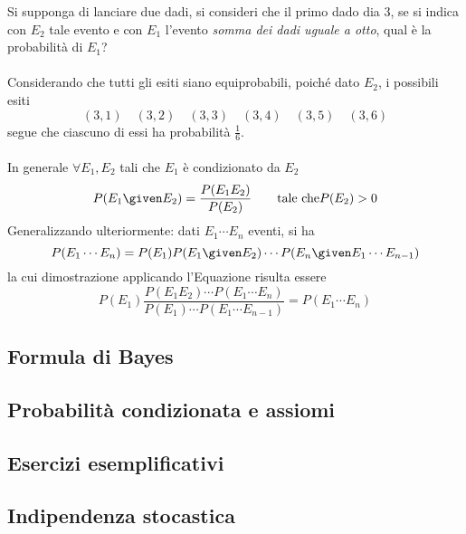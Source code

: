\documentclass{subfiles}
\begin{document}
Si supponga di lanciare due dadi, si consideri che il primo dado dia 3, se si indica con \(E_{2}\) tale evento e con \(E_{1}\) l'evento \emph{somma dei dadi uguale a otto},
qual è la probabilità di \(E_{1}\)?
\\ \\
Considerando che tutti gli esiti siano equiprobabili, poiché dato \(E_{2}\), i possibili esiti
\[
    (3, 1) \quad (3, 2) \quad (3, 3) \quad (3, 4) \quad (3, 5) \quad (3, 6)
\]
segue che ciascuno di essi ha probabilità \(\tfrac{1}{6}\).
\\ \\
In generale \(\forall E_{1}, E_{2}\) tali che \(E_{1}\) è condizionato da \(E_{2}\)
\begin{equation}
    P(E_{1} \given E_{2}) = \frac{P(E_{1}E_{2})}{P(E_{2})} \qquad \text{tale che} P(E_{2}) > 0
\end{equation}
Generalizzando ulteriormente: dati \(E_{1} \cdots E_{n}\) eventi, si ha
\[
    P(E_{1}\cdots E_{n}) = P(E_{1})P(E_{1} \given E_{2})\cdots P(E_{n} \given E_{1}\cdots E_{n-1})
\]
la cui dimostrazione applicando l'Equazione risulta essere
\[
    P(E_{1})\frac{P(E_{1}E_{2}) \cdots P(E_{1} \cdots E_{n})}{P(E_{1}) \cdots P(E_{1} \cdots E_{n - 1})} = P(E_{1} \cdots E_{n})
\]

\subsection{Formula di Bayes}


\subsection{Probabilità condizionata e assiomi}


\subsection{Esercizi esemplificativi}


\subsection{Indipendenza stocastica}

\end{document}
